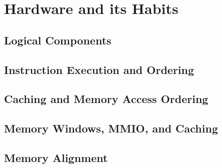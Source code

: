 
\chapter{Hardware and its Habits}
\label{chp:Hardware and its Habits}



\section{Logical Components}
\label{sec:cpu:Logical Components}

\section{Instruction Execution and Ordering}
\label{sec:cpu:Instruction Execution and Ordering}

\section{Caching and Memory Access Ordering}
\label{sec:cpu:Caching and Memory Access Ordering}

\section{Memory Windows, MMIO, and Caching}
\label{sec:cpu:Memory Windows, MMIO, and Caching}

\section{Memory Alignment}
\label{sec:cpu:Memory Alignment}
